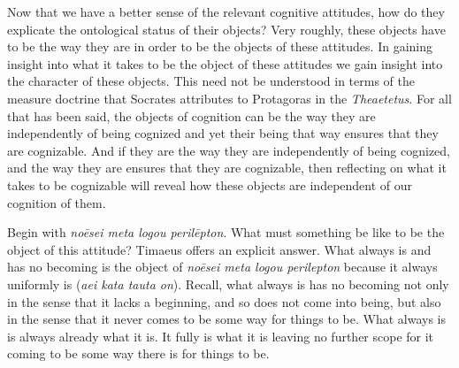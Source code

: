 Now that we have a better sense of the relevant cognitive attitudes, how do they explicate the ontological status of their objects? Very roughly, these objects have to be the way they are in order to be the objects of these attitudes. In gaining insight into what it takes to be the object of these attitudes we gain insight into the character of these objects. This need not be understood in terms of the measure doctrine that Socrates attributes to Protagoras in the \emph{Theaetetus}. For all that has been said, the objects of cognition can be the way they are independently of being cognized and yet their being that way ensures that they are cognizable. And if they are the way they are independently of being cognized, and the way they are ensures that they are cognizable, then reflecting on what it takes to be cognizable will reveal how these objects are independent of our cognition of them.

Begin with \emph{noēsei meta logou perilēpton}. What must something be like to be the object of this attitude? Timaeus offers an explicit answer. What always is and has no becoming is the object of \emph{noēsei meta logou perilepton} because it always uniformly is (\emph{aei kata tauta on}). Recall, what always is has no becoming not only in the sense that it lacks a beginning, and so does not come into being, but also in the sense that it never comes to be some way for things to be. What always is is always already what it is. It fully is what it is leaving no further scope for it coming to be some way there is for things to be. 

